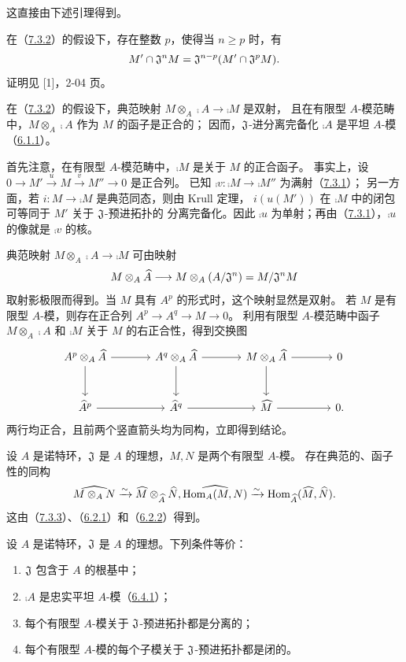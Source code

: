 这直接由下述引理得到。

在（\hyperlink{para:0:7.3.2}{7.3.2}）的假设下，存在整数 $p$，使得当 $n\geq p$ 时，有
\[
 M'\cap\mathfrak J^nM=\mathfrak J^{n-p}(M'\cap\mathfrak J^pM).
\]
证明见 [1]，2-04 页。

在（\hyperlink{para:0:7.3.2}{7.3.2}）的假设下，典范映射 $M\otimes_A\comp A\to\comp M$ 是双射，
且在有限型 $A$-模范畴中，$M\otimes_A\comp A$ 作为 $M$ 的函子是正合的；
因而，$\mathfrak J$-进分离完备化 $\comp A$ 是平坦 $A$-模（\hyperlink{para:0:6.1.1}{6.1.1}）。

首先注意，在有限型 $A$-模范畴中，$\comp M$ 是关于 $M$ 的正合函子。
事实上，设
$0\to M'\xrightarrow{u}M\xrightarrow{v}M''\to0$ 是正合列。
已知 $\comp v:\comp M\to\comp{M''}$ 为满射（\hyperlink{para:0:7.3.1}{7.3.1}）；
另一方面，若 $i:M\to\comp M$ 是典范同态，则由 Krull 定理，
$i(u(M'))$ 在 $\comp M$ 中的闭包可等同于 $M'$ 关于 $\mathfrak J$-预进拓扑的
分离完备化。因此 $\comp u$ 为单射；再由（\hyperlink{para:0:7.3.1}{7.3.1}），$\comp u$ 的像就是
$\comp v$ 的核。

典范映射 $M\otimes_A\comp A\to\comp M$ 可由映射
\[
 M\otimes_A\widehat{A}\longrightarrow
 M\otimes_A(A/\mathfrak J^n)=M/\mathfrak J^nM
\]
取射影极限而得到。当 $M$ 具有 $A^p$ 的形式时，这个映射显然是双射。
若 $M$ 是有限型 $A$-模，则存在正合列 $A^p\to A^q\to M\to0$。
利用有限型 $A$-模范畴中函子 $M\otimes_A\comp A$ 和 $\comp M$ 关于 $M$
的右正合性，得到交换图
\[
\begin{tikzcd}[column sep=large,row sep=large]
 A^p\otimes_A\comp A \arrow[r] \arrow[d] &
 A^q\otimes_A\comp A \arrow[r] \arrow[d] &
 M\otimes_A\comp A \arrow[r] \arrow[d] &0\\
 \comp A^p \arrow[r] &\comp A^q \arrow[r] &\comp M\arrow[r]&0.
\end{tikzcd}
\]
两行均正合，且前两个竖直箭头均为同构，立即得到结论。

设 $A$ 是诺特环，$\mathfrak J$ 是 $A$ 的理想，$M,N$ 是两个有限型 $A$-模。
存在典范的、函子性的同构
\[
 \comp{M\otimes_A N}\xrightarrow{\sim}
 \comp M\otimes_{\comp A}\comp N,
 \qquad
 \comp{\Hom_A(M,N)}\xrightarrow{\sim}
 \Hom_{\comp A}(\comp M,\comp N).
\]
这由（\hyperlink{para:0:7.3.3}{7.3.3}）、（\hyperlink{para:0:6.2.1}{6.2.1}）和（\hyperlink{para:0:6.2.2}{6.2.2}）得到。

设 $A$ 是诺特环，$\mathfrak J$ 是 $A$ 的理想。下列条件等价：
\begin{enumerate}[label=\alph*)]
\item $\mathfrak J$ 包含于 $A$ 的根基中；
\item $\comp A$ 是忠实平坦 $A$-模（\hyperlink{para:0:6.4.1}{6.4.1}）；
\item 每个有限型 $A$-模关于 $\mathfrak J$-预进拓扑都是分离的；
\item 每个有限型 $A$-模的每个子模关于 $\mathfrak J$-预进拓扑都是闭的。
\end{enumerate}

